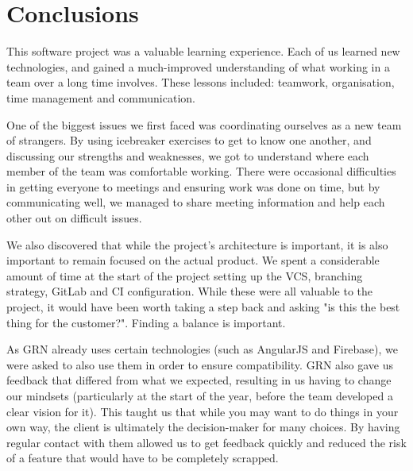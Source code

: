\documentclass{l3proj}
\begin{document}
\newpage
\section{Conclusions} %
\label{sec:conclusion}


This software project was a valuable learning experience. Each of
 us learned new technologies, and gained a much-improved understanding
 of what working in a team over a long time involves. These lessons
 included: teamwork, organisation, time management and communication.

One of the biggest issues we first faced was coordinating ourselves as a
 new team of strangers. By using icebreaker exercises to get to know
 one another, and discussing our strengths and weaknesses, we got to
 understand where each member of the team was comfortable working. There
 were occasional difficulties in getting everyone to meetings and ensuring
 work was done on time, but by communicating well, we managed to share
 meeting information and help each other out on difficult issues.

We also discovered that while the project's architecture is important,
 it is also important to remain focused on the actual product. We
 spent a considerable amount of time at the start of the project setting
 up the VCS, branching strategy, GitLab and CI configuration. While these
 were all valuable to the project, it would have been worth taking a step
 back and asking "is this the best thing for the customer?". Finding a balance
 is important.

As GRN already uses certain technologies (such as AngularJS and Firebase),
 we were asked to also use them in order to ensure compatibility. GRN also
 gave us feedback that differed from what we expected, resulting in us
 having to change our mindsets (particularly at the start of the year,
 before the team developed a clear vision for it). This taught us that
 while you may want to do things in your own way, the client is ultimately
 the decision-maker for many choices. By having regular contact with them
 allowed us to get feedback quickly and reduced the risk of a feature that
 would have to be completely scrapped.
\end{document}
